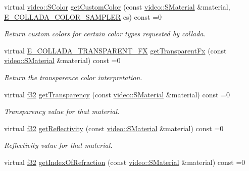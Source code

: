 \begin{DoxyCompactItemize}
virtual \hyperlink{classirr_1_1video_1_1SColor}{video\+::\+S\+Color} \hyperlink{classirr_1_1scene_1_1IColladaMeshWriterProperties_a8028af2323dab63df4bdfeb292ec48cd}{get\+Custom\+Color} (const \hyperlink{classirr_1_1video_1_1SMaterial}{video\+::\+S\+Material} \&material, \hyperlink{namespaceirr_1_1scene_a6204218341c6b449d879cd8367b2f8d8}{E\+\_\+\+C\+O\+L\+L\+A\+D\+A\+\_\+\+C\+O\+L\+O\+R\+\_\+\+S\+A\+M\+P\+L\+ER} cs) const =0
\begin{DoxyCompactList}\small\item\em Return custom colors for certain color types requested by collada. \end{DoxyCompactList}\item 
virtual \hyperlink{namespaceirr_1_1scene_af7dadd5b96b683cfe1800f343c4f6619}{E\+\_\+\+C\+O\+L\+L\+A\+D\+A\+\_\+\+T\+R\+A\+N\+S\+P\+A\+R\+E\+N\+T\+\_\+\+FX} \hyperlink{classirr_1_1scene_1_1IColladaMeshWriterProperties_a0d934ae86d3e587ae22f74d775bbfa36}{get\+Transparent\+Fx} (const \hyperlink{classirr_1_1video_1_1SMaterial}{video\+::\+S\+Material} \&material) const =0
\begin{DoxyCompactList}\small\item\em Return the transparence color interpretation. \end{DoxyCompactList}\item 
virtual \hyperlink{namespaceirr_a0277be98d67dc26ff93b1a6a1d086b07}{f32} \hyperlink{classirr_1_1scene_1_1IColladaMeshWriterProperties_ac547e1f89f4655751ecd570ad70d010b}{get\+Transparency} (const \hyperlink{classirr_1_1video_1_1SMaterial}{video\+::\+S\+Material} \&material) const =0
\begin{DoxyCompactList}\small\item\em Transparency value for that material. \end{DoxyCompactList}\item 
virtual \hyperlink{namespaceirr_a0277be98d67dc26ff93b1a6a1d086b07}{f32} \hyperlink{classirr_1_1scene_1_1IColladaMeshWriterProperties_ad880b5fc91114049b20347a31199b2a9}{get\+Reflectivity} (const \hyperlink{classirr_1_1video_1_1SMaterial}{video\+::\+S\+Material} \&material) const =0
\begin{DoxyCompactList}\small\item\em Reflectivity value for that material. \end{DoxyCompactList}\item 
virtual \hyperlink{namespaceirr_a0277be98d67dc26ff93b1a6a1d086b07}{f32} \hyperlink{classirr_1_1scene_1_1IColladaMeshWriterProperties_ab7ec58f708ebebe941246e6c78b0691d}{get\+Index\+Of\+Refraction} (const \hyperlink{classirr_1_1video_1_1SMaterial}{video\+::\+S\+Material} \&material) const =0

\end{DoxyCompactItemize}
